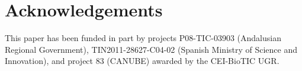 \documentclass{llncs}
\begin{document}

\section*{Acknowledgements}

This paper has been funded in part by projects P08-TIC-03903 (Andalusian Regional Government), TIN2011-28627-C04-02 (Spanish Ministry of Science and Innovation), and project 83 (CANUBE) awarded by the CEI-BioTIC UGR.



\end{document}
